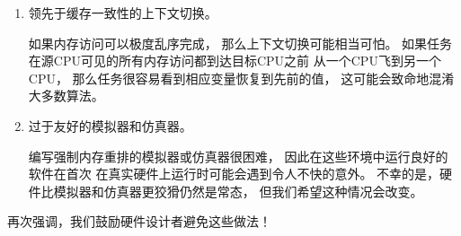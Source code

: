 \begin{enumerate}
\item	领先于缓存一致性的上下文切换。

	如果内存访问可以极度乱序完成，
	那么上下文切换可能相当可怕。
	如果任务在源CPU可见的所有内存访问都到达目标CPU之前
	从一个CPU飞到另一个CPU，
	那么任务很容易看到相应变量恢复到先前的值，
	这可能会致命地混淆大多数算法。

\item	过于友好的模拟器和仿真器。

	编写强制内存重排的模拟器或仿真器很困难，
	因此在这些环境中运行良好的软件在首次
	在真实硬件上运行时可能会遇到令人不快的意外。
	不幸的是，硬件比模拟器和仿真器更狡猾仍然是常态，
	但我们希望这种情况会改变。
\end{enumerate}

再次强调，我们鼓励硬件设计者避免这些做法！


